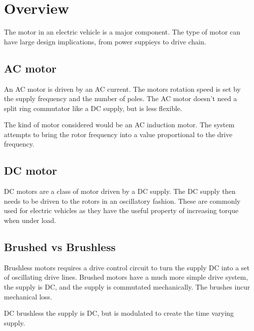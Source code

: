 \documentclass{article}
\begin{document}
\section{Overview}
The motor in an electric vehicle is a major component.
The type of motor can have large design implications, from power suppieys to drive chain.
\subsection{AC motor}
An AC motor is driven by an AC current.
The motors rotation speed is set by the supply frequency and the number of poles.
The AC motor doesn't need a split ring commutator like a DC supply, but is less flexible.

The kind of motor considered would be an AC induction motor.
The system attempts to bring the rotor frequency into a value proportional to the drive frequency.

\subsection{DC motor}
DC motors are a class of motor driven by a DC supply.
The DC supply then needs to be driven to the rotors in an oscillatory fashion. 
These are commonly used for electric vehicles as they have the useful property of increasing torque when under load. 
\subsection{Brushed vs Brushless}
Brushless motors requires a drive control circuit to turn the supply DC into a set of oscillating drive lines.
Brushed motors have a much more simple drive system, the supply is DC, and the supply is commutated mechanically.
The brushes incur mechanical loss.

DC brushless the supply is DC, but is modulated to create the time varying supply.
\end{document}
